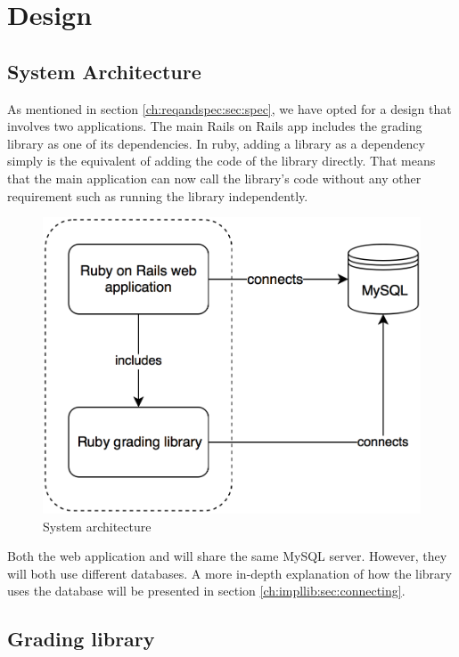 \chapter{Design}

\section{System Architecture}

As mentioned in section \ref{ch:reqandspec:sec:spec}, we have opted for a design that involves two applications. The main Rails on Rails app includes the grading library as one of its dependencies. In ruby, adding a library as a dependency simply is the equivalent of adding the code of the library directly. That means that the main application can now call the library's code without any other requirement such as running the library independently.

\begin{figure}[h]
    \centering
    \includegraphics[width=(\linewidth / 2)]{Chapters/4-Design/sysarh.png}
    \caption{System architecture}
\end{figure}

Both the web application and will share the same MySQL server. However, they will both use different databases. A more in-depth explanation of how the library uses the database will be presented in section \ref{ch:impllib:sec:connecting}.

\section{Grading library}

